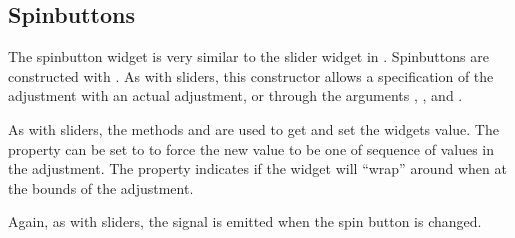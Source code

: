 \subsection{Spinbuttons}
\label{sec:RGtk2:spinboxes}

The spinbutton widget is very similar to the slider widget in \GTK. Spinbuttons are constructed with
. As with sliders, this constructor allows a
specification of the adjustment with an actual adjustment, or through
the arguments , , and
. 

As with sliders, the methods
 and 
are used to get and set the widgets value. The property
 can be set to  to force the new value
to be one of sequence of values in the adjustment. The 
property indicates if the widget will ``wrap'' around when at the
bounds of the adjustment.

Again, as with sliders, the  signal is emitted when the
spin button is changed. 

